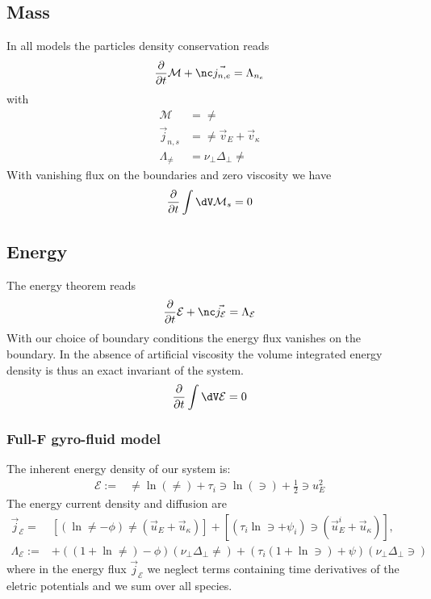 \subsection{Mass}
In all models the particles density conservation reads
\begin{align} \label{eq:mass_theorem}
  \frac{\partial}{\partial t} \mathcal M
  + \nc\vec{ j_{n,e}}
  =  \Lambda_{\ne}
\end{align}
with
\begin{align}
    \mathcal M &= \ne \\
    \vec j_{n,s} &= \ne \vec v_E + \vec v_\kappa \\
     \Lambda_\ne &= \nu_\perp \Delta_\perp \ne
\end{align}
With vanishing flux on the boundaries and zero viscosity we have
\begin{align}
    \frac{\partial}{\partial t} \int \dV \mathcal M_s = 0
\end{align}

\subsection{Energy}
The energy theorem reads
\begin{align} \label{eq:energy_theorem}
  \frac{\partial}{\partial t} \mathcal E
  + \nc\vec{ j_{\mathcal E}}
  =  \Lambda_{\mathcal E}
\end{align}
With our choice of boundary conditions the energy flux
vanishes on the boundary.
In the absence of artificial viscosity the volume integrated
 energy density is thus an exact invariant of the system.
\begin{align}
    \frac{\partial}{\partial t} \int \dV \mathcal E = 0
\end{align}

\subsubsection{ Full-F gyro-fluid model}
The inherent energy density of our system is:
\begin{align}
 \mathcal{E} := &
 \ne \ln{(\ne)} + \tau_i \ni\ln{(\ni)}  + \frac{1}{2} \ni u_E^2
\end{align}
The energy current density and diffusion are
\begin{align}
  \vec j_{\mathcal E} =& \left[
  \left( \ln \ne - \phi \right)\ne\left(
  \vec u_E + \vec u_\kappa \right) \right]
  +\left[
      \left(\tau_i \ln \ni + \psi_{i} \right)\ni\left(
  \vec u_E^i + \vec u_\kappa \right) \right]
  , \\
    \Lambda_\mathcal{E} :=  &+ \left( ( 1+\ln \ne) - \phi\right)(\nu_\perp \Delta_\perp \ne)+ \left( \tau_i( 1+\ln \ni) + \psi\right)(\nu_\perp \Delta_\perp \ni)
    \label{eq:energy_diffusion}
\end{align}
where in the energy flux $\vec j_{\mathcal E}$
we neglect terms  containing time derivatives
of the eletric potentials and we sum over all species.

